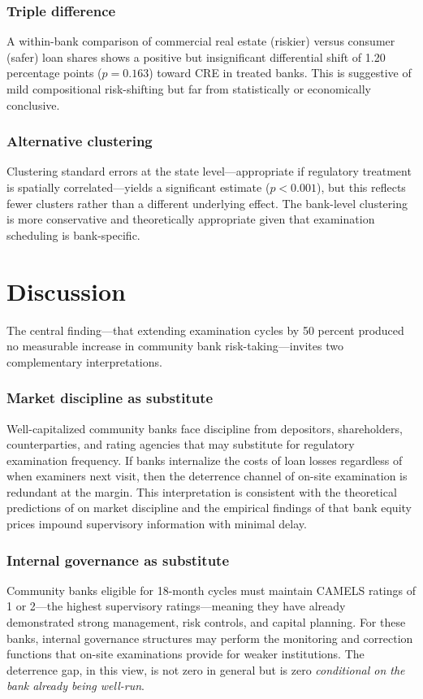 \documentclass[12pt]{article}
\begin{document}
\subsubsection*{Triple difference} A within-bank comparison of commercial real estate (riskier) versus consumer (safer) loan shares shows a positive but insignificant differential shift of 1.20 percentage points ($p = 0.163$) toward CRE in treated banks. This is suggestive of mild compositional risk-shifting but far from statistically or economically conclusive.

\subsubsection*{Alternative clustering} Clustering standard errors at the state level---appropriate if regulatory treatment is spatially correlated---yields a significant estimate ($p < 0.001$), but this reflects fewer clusters rather than a different underlying effect. The bank-level clustering is more conservative and theoretically appropriate given that examination scheduling is bank-specific.


\section{Discussion}

The central finding---that extending examination cycles by 50 percent produced no measurable increase in community bank risk-taking---invites two complementary interpretations.

\subsubsection*{Market discipline as substitute} Well-capitalized community banks face discipline from depositors, shareholders, counterparties, and rating agencies that may substitute for regulatory examination frequency. If banks internalize the costs of loan losses regardless of when examiners next visit, then the deterrence channel of on-site examination is redundant at the margin. This interpretation is consistent with the theoretical predictions of \citet{calomiris2006} on market discipline and the empirical findings of \citet{flannery2001} that bank equity prices impound supervisory information with minimal delay.

\subsubsection*{Internal governance as substitute} Community banks eligible for 18-month cycles must maintain CAMELS ratings of 1 or 2---the highest supervisory ratings---meaning they have already demonstrated strong management, risk controls, and capital planning. For these banks, internal governance structures may perform the monitoring and correction functions that on-site examinations provide for weaker institutions. The deterrence gap, in this view, is not zero in general but is zero \textit{conditional on the bank already being well-run}.
\end{document}
